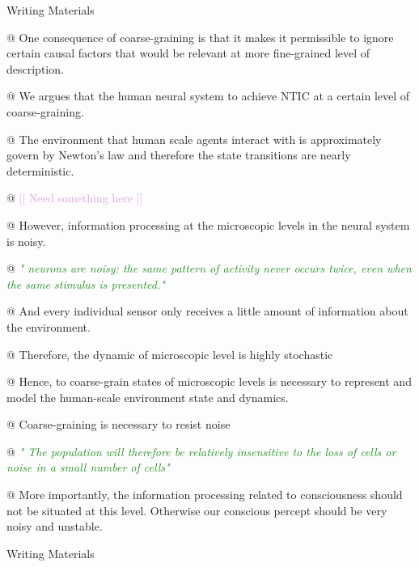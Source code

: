 \documentclass[utf8]{article}
\newenvironment{writingMaterials}
			{	
			\begin{tcolorbox}[size=small, colframe=black!20!white, toprule=1mm]
				Writing Materials
			\end{tcolorbox}
			
			\begin{easylist}[itemize]		
			}
			{
			\end{easylist}
			\begin{tcolorbox}[size=small, bottomrule=1mm, halign=flush right, colframe=black!20!white]
				Writing Materials
			\end{tcolorbox}			
			}
\newcommand{\rewrite}[1]{\textcolor{ForestGreen}{\textit{"#1"}}\newline}
\newcommand{\idea}[2][Plum]{\noindent
				\textcolor{#1}{[[ #2 ]]}}
\newcommand{\callforhelp}[1]{\todo[color=SpringGreen]{#1}}
\begin{document}
	
		\begin{writingMaterials}									
		
			@ One consequence of coarse-graining is that it makes it permissible to ignore certain causal factors that would be relevant at more fine-grained level of description. \cite{price2007causation}
			
			
			
			@ We argues that the human neural system to achieve NTIC at a certain level of coarse-graining. 
			
			
			
			@ The environment that human scale agents interact with is approximately govern by Newton's law and therefore the state transitions are nearly deterministic.\callforhelp{Is there any good ref I can cite?} 
			
			@ \idea{Need something here}
			
			
			@ However, information processing at the microscopic levels in the neural system is noisy. 
			
			
			@ \rewrite{
				neurons are noisy: the same pattern of activity never occurs twice, even when the same stimulus is presented.}
			
			
			@ And every individual sensor only receives a little amount of information about the environment. 
			
			@ Therefore, the dynamic of microscopic level is highly stochastic 
			
			
			@ Hence, to coarse-grain states of microscopic levels is necessary to represent and model the human-scale environment state and dynamics. 
			
			@ Coarse-graining is necessary to resist noise
			
			@ \rewrite{ The population will therefore be relatively insensitive to the loss of
				cells or noise in a small number of cells} \cite{eurich2000multidimensional}
						
			
			@ More importantly, the information processing related to consciousness should not be situated at this level. Otherwise our conscious percept should be very noisy and unstable.
								
			
		\end{writingMaterials}
	
	
\end{document}
